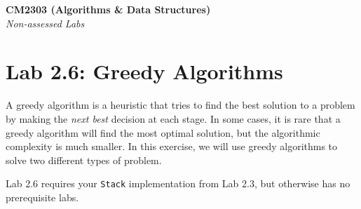 \documentclass[11pt,a4paper]{report}
\begin{document}
\noindent\Large\textbf{CM2303 (Algorithms \& Data Structures)}\\
\noindent\large\textit{Non-assessed Labs}
\vskip30pt

\section*{Lab 2.6: Greedy Algorithms}

A greedy algorithm is a heuristic that tries to find the best solution to a problem by making the \textit{next best} decision at each stage. In some cases, it is rare that a greedy algorithm will find the most optimal solution, but the algorithmic complexity is much smaller. In this exercise, we will use greedy algorithms to solve two different types of problem.

Lab 2.6 requires your \texttt{Stack} implementation from Lab 2.3, but otherwise has no prerequisite labs.
\end{document}
